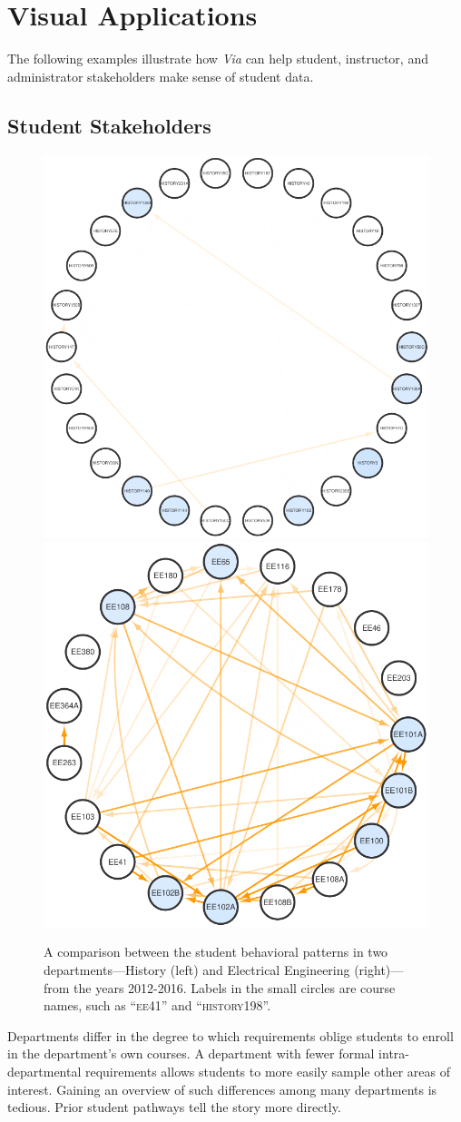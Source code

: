 \section{Visual Applications}
\label{sec:analysis}
The following examples illustrate how {\em Via} can help student,
instructor, and administrator stakeholders make sense of student data.

\subsection{Student Stakeholders}
\label{sec:student-stakeholders}

\begin{figure}
    \centering
    \includegraphics[width=0.55\columnwidth]{Figs/final-modularity-history.pdf}
    \includegraphics[width=0.44\columnwidth]{Figs/final-modularity-ee.pdf}
    \caption{A comparison between the student behavioral patterns in two departments---History (left) and Electrical Engineering (right)---from the years 2012-2016. Labels in the small circles are course names, such as ``\textsc{ee41}'' and ``\textsc{history198}''.}
    \label{fig:modularity}
\end{figure}

Departments differ in the degree to which requirements oblige students to enroll in the department's own courses. A department with fewer formal
intra-departmental requirements allows students to more easily sample
other areas of interest. Gaining an overview of such differences among
many departments is tedious. Prior student pathways tell the story
more directly.

